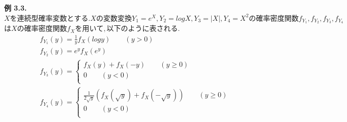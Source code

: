 \documentclass[dvipdfmx,10pt, a4j]{jarticle}
\theoremstyle{definition}
\begin{document}
\begin{enumerate}[i)]
        \noindent
        \textbf{例 3.3.} $Xを連続型確率変数とする. X の変数変換 Y_1 = e^{X}, Y_2 = logX, Y_3 = |X|, Y_4 = X^{2} の確率密度関数 f_{Y_1}, f_{Y_2}, f_{Y_3}, f_{Y_4}$
        $はXの確率密度関数 f_X を用いて, 以下のように表される.$\\
        \begin{align*}
            &f_{Y_1}(y) = \frac{1}{y}f_X(logy) \qquad (y > 0)\\
            &f_{Y_2}(y) = e^{y}f_X(e^{y})\\
            &f_{Y_3}(y) =
            \begin{cases}
                f_X(y) + f_X(-y) \qquad (y \geq 0)\\
                0 \qquad (y < 0)\\
            \end{cases}\\
            &f_{Y_4}(y) =
            \begin{cases}
                \frac{1}{2 \sqrt{y}}(f_X(\sqrt{y}) + f_X(- \sqrt{y})) \qquad (y \geq 0)\\
                0 \qquad (y < 0)\\
            \end{cases}
        \end{align*}    
    \end{enumerate}
\end{document}

